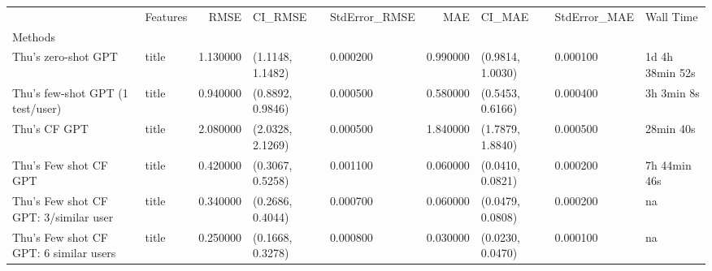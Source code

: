 \begin{tabular}{llrllrlll}
 & Features & RMSE & CI_RMSE & StdError_RMSE & MAE & CI_MAE & StdError_MAE & Wall Time \\
Methods &  &  &  &  &  &  &  &  \\
Thu's zero-shot GPT & title & 1.130000 & (1.1148, 1.1482) & 0.000200 & 0.990000 & (0.9814, 1.0030) & 0.000100 & 1d 4h 38min 52s \\
Thu's few-shot GPT (1 test/user) & title & 0.940000 & (0.8892, 0.9846) & 0.000500 & 0.580000 & (0.5453, 0.6166) & 0.000400 & 3h 3min 8s \\
Thu's CF GPT & title & 2.080000 & (2.0328, 2.1269) & 0.000500 & 1.840000 & (1.7879, 1.8840) & 0.000500 & 28min 40s \\
Thu's Few shot CF GPT & title & 0.420000 & (0.3067, 0.5258) & 0.001100 & 0.060000 & (0.0410, 0.0821) & 0.000200 & 7h 44min 46s \\
Thu's Few shot CF GPT: 3/similar user & title & 0.340000 & (0.2686, 0.4044) & 0.000700 & 0.060000 & (0.0479, 0.0808) & 0.000200 & na \\
Thu's Few shot CF GPT: 6 similar users & title & 0.250000 & (0.1668, 0.3278) & 0.000800 & 0.030000 & (0.0230, 0.0470) & 0.000100 & na \\
\end{tabular}
